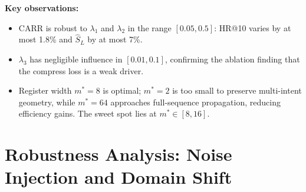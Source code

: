 \documentclass[letterpaper,10pt]{article}
\begin{document}
\begin{table}[h!]
\centering
\caption{Hyperparameter Sensitivity on ML-1M (HR@10 / $\widehat{S}_L$)\label{tab:supp-lambda}}
\setlength{\tabcolsep}{4pt}
\end{table}

\noindent\textbf{Key observations:}
\begin{itemize}
  \item CARR is robust to $\lambda_1$ and $\lambda_2$ in the range $[0.05, 0.5]$: HR@10 varies by at most 1.8\% and $\widehat{S}_L$ by at most 7\%.
  \item $\lambda_3$ has negligible influence in $[0.01, 0.1]$, confirming the ablation finding that the compress loss is a weak driver.
  \item Register width $m^*=8$ is optimal; $m^*=2$ is too small to preserve multi-intent geometry, while $m^*=64$ approaches full-sequence propagation, reducing efficiency gains. The sweet spot lies at $m^* \in [8, 16]$.
\end{itemize}

\section{Robustness Analysis: Noise Injection and Domain Shift}
\label{sec:supp-robustness}
\end{document}
